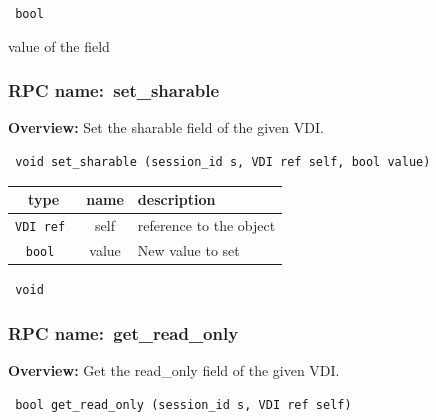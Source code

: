 \vspace{0.3cm}

{\tt 
bool
}


value of the field
\vspace{0.3cm}
\vspace{0.3cm}
\vspace{0.3cm}
\subsubsection{RPC name:~set\_sharable}

{\bf Overview:} 
Set the sharable field of the given VDI.

\begin{verbatim} void set_sharable (session_id s, VDI ref self, bool value)\end{verbatim}



 
\vspace{0.3cm}
\begin{tabular}{|c|c|p{7cm}|}
 \hline
{\bf type} & {\bf name} & {\bf description} \\ \hline
{\tt VDI ref } & self & reference to the object \\ \hline 

{\tt bool } & value & New value to set \\ \hline 

\end{tabular}

\vspace{0.3cm}

{\tt 
void
}



\vspace{0.3cm}
\vspace{0.3cm}
\vspace{0.3cm}
\subsubsection{RPC name:~get\_read\_only}

{\bf Overview:} 
Get the read\_only field of the given VDI.

\begin{verbatim} bool get_read_only (session_id s, VDI ref self)\end{verbatim}



